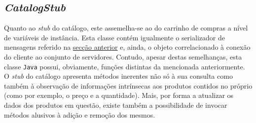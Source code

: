 \documentclass[a4paper]{report}
\begin{document}
{		\subsection{\textit{CatalogStub}} \label{subsec:ClientCatalogStub}
		Quanto ao \textit{stub} do catálogo, este assemelha-se ao do carrinho de compras a nível de variáveis de instância. Esta classe contém igualmente o serializador de mensagens referido na \hyperref[subsec:ClientCartStub]{secção anterior} e, ainda, o objeto correlacionado à conexão do cliente ao conjunto de servidores.
		Contudo, apesar destas semelhanças, esta classe \texttt{Java} possui, obviamente, funções distintas da mencionada anteriormente.
		O \textit{stub} do catálogo apresenta métodos inerentes não só à sua consulta como também à observação de informações intrínsecas aos produtos contidos no próprio (como por exemplo, o preço e a quantidade).
		Mais, por forma a atualizar os dados dos produtos em questão, existe também a possibilidade de invocar métodos alusivos à adição e remoção dos mesmos.
}
\end{document}
